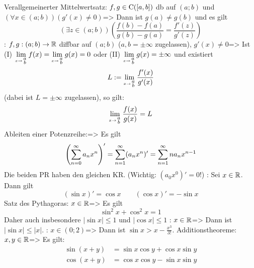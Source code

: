 \theorem Verallgemeinerter Mittelwertsatz:
  $f,g\in{\rm C}([a,b])$ db auf $(a;b)$ und $(\forall x\in(a;b))(g'(x)\ne 0)$=>{
  Dann ist $g(a)\ne g(b)$ und es gilt
  \[(\exists z\in(a;b))\left(\frac{f(b)-f(a)}{g(b)-g(a)}=\frac{f'(z)}{g'(z)}\right)
    \]
  }
\def\limxab{\limx{\hbox{$\scriptscriptstyle\stack(a;b)$}}}
\theorem:
  $f,g:(a;b)\to\mathbb R$ diffbar auf $(a;b)$ ($a,b=\pm\infty$ zugelassen), $g'(x)\ne 0$=>{
  Ist (I) $\limxab f(x)=\limxab g(x)=0$ oder
  (II) $\limxab g(x)=\pm\infty$ und 
  existiert 
  \[L:=\limxab \frac{f'(x)}{g'(x)}
    \] 
  (dabei ist $L=\pm\infty$ zugelassen), so gilt:
  \[\limxab \frac{f(x)}{g(x)}=L 
    \]
  }
\theorem Ableiten einer Potenzreihe:=>{
  Es gilt
  \[\left( \sumn 0 a_n x^n \right)'=\sumn 1 (a_n x^n)'=\sumn 1 n a_n x^{n-1}
    \]
  Die beiden PR haben den gleichen KR. (Wichtig: $(a_0 x^0)'=0$!)
  }
\example:{
  Sei $x\in\mathbb R$. Dann gilt
  \[(\sin x)'=\cos x \qquad (\cos x)'=-\sin x 
    \]
  }
\theorem Satz des Pythagoras:
  $x\in\mathbb R$=>{
  Es gilt
  \[\sin^2 x+\cos^2 x=1
    \]
  Daher auch insbesondere $|\sin x|\le 1$ und $|\cos x|\le 1$
  }
\theorem:
  $x\in\mathbb R$=>{
  Dann ist $|\sin x| \le |x|$.
  }
\theorem:
  $x\in(0;2)$=>{
  Dann ist $\sin x > x-\frac{x^3}{3!}$.
  }
\theorem Additionstheoreme:$x,y\in\mathbb R$=>{
  Es gilt:
  \begin{align*}
    \sin (x+y)&=\sin x \cos y+ \cos x \sin y\\
    \cos (x+y)&=\cos x \cos y- \sin x \sin y\\
    \end{align*}
  }
